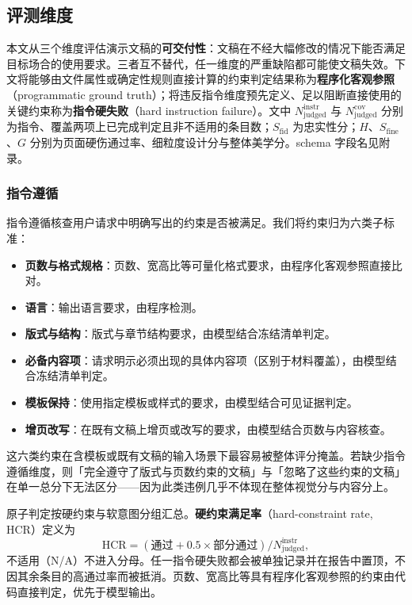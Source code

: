 \subsection{评测维度}\label{ux8bc4ux6d4bux7ef4ux5ea6}

本文从三个维度评估演示文稿的\textbf{可交付性}：文稿在不经大幅修改的情况下能否满足目标场合的使用要求。三者互不替代，任一维度的严重缺陷都可能使文稿失效。下文将能够由文件属性或确定性规则直接计算的约束判定结果称为\textbf{程序化客观参照}（programmatic ground truth）；将违反指令维度预先定义、足以阻断直接使用的关键约束称为\textbf{指令硬失败}（hard instruction failure）。文中 \(N^{\text{instr}}_{\text{judged}}\) 与 \(N^{\text{cov}}_{\text{judged}}\) 分别为指令、覆盖两项上已完成判定且非不适用的条目数；\(S_{\text{fid}}\) 为忠实性分；\(H\)、\(S_{\text{fine}}\)、\(G\) 分别为页面硬伤通过率、细粒度设计分与整体美学分。schema 字段名见附录。

\subsubsection{指令遵循}\label{ux6307ux4ee4ux9075ux5faa}

指令遵循核查用户请求中明确写出的约束是否被满足。我们将约束归为六类子标准：

\begin{itemize}
\tightlist
\item
  \textbf{页数与格式规格}：页数、宽高比等可量化格式要求，由程序化客观参照直接比对。
\item
  \textbf{语言}：输出语言要求，由程序检测。
\item
  \textbf{版式与结构}：版式与章节结构要求，由模型结合冻结清单判定。
\item
  \textbf{必备内容项}：请求明示必须出现的具体内容项（区别于材料覆盖），由模型结合冻结清单判定。
\item
  \textbf{模板保持}：使用指定模板或样式的要求，由模型结合可见证据判定。
\item
  \textbf{增页改写}：在既有文稿上增页或改写的要求，由模型结合页数与内容核查。
\end{itemize}

这六类约束在含模板或既有文稿的输入场景下最容易被整体评分掩盖。若缺少指令遵循维度，则「完全遵守了版式与页数约束的文稿」与「忽略了这些约束的文稿」在单一总分下无法区分------因为此类违例几乎不体现在整体视觉分与内容分上。

原子判定按硬约束与软意图分组汇总。\textbf{硬约束满足率}（hard-constraint rate, HCR）定义为 \[\text{HCR}=(\text{通过}+0.5\times\text{部分通过})/N^{\text{instr}}_{\text{judged}},\] 不适用（N/A）不进入分母。任一指令硬失败都会被单独记录并在报告中置顶，不因其余条目的高通过率而被抵消。页数、宽高比等具有程序化客观参照的约束由代码直接判定，优先于模型输出。


